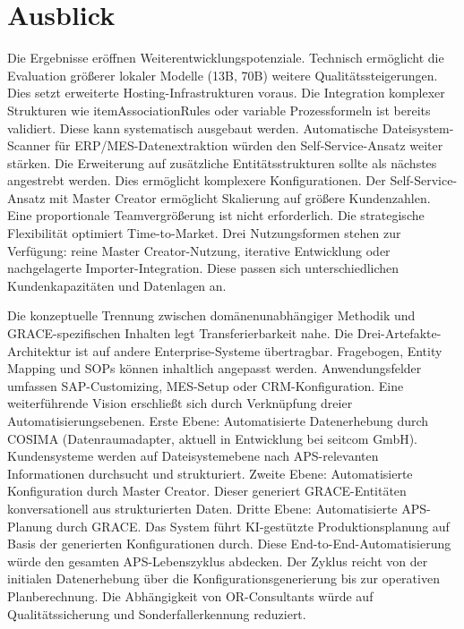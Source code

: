 \section{Ausblick}
\label{sec:Ausblick}

Die Ergebnisse eröffnen Weiterentwicklungspotenziale. Technisch ermöglicht die Evaluation größerer lokaler Modelle (13B, 70B) weitere Qualitätssteigerungen. Dies setzt erweiterte Hosting-Infrastrukturen voraus. Die Integration komplexer Strukturen wie itemAssociationRules oder variable Prozessformeln ist bereits validiert. Diese kann systematisch ausgebaut werden. Automatische Dateisystem-Scanner für ERP/MES-Datenextraktion würden den Self-Service-Ansatz weiter stärken. Die Erweiterung auf zusätzliche Entitätsstrukturen sollte als nächstes angestrebt werden. Dies ermöglicht komplexere Konfigurationen. Der Self-Service-Ansatz mit Master Creator ermöglicht Skalierung auf größere Kundenzahlen. Eine proportionale Teamvergrößerung ist nicht erforderlich. Die strategische Flexibilität optimiert Time-to-Market. Drei Nutzungsformen stehen zur Verfügung: reine Master Creator-Nutzung, iterative Entwicklung oder nachgelagerte Importer-Integration. Diese passen sich unterschiedlichen Kundenkapazitäten und Datenlagen an.

Die konzeptuelle Trennung zwischen domänenunabhängiger Methodik und GRACE-spezifischen Inhalten legt Transferierbarkeit nahe. Die Drei-Artefakte-Architektur ist auf andere Enterprise-Systeme übertragbar. Fragebogen, Entity Mapping und SOPs können inhaltlich angepasst werden. Anwendungsfelder umfassen SAP-Customizing, MES-Setup oder CRM-Konfiguration. Eine weiterführende Vision erschließt sich durch Verknüpfung dreier Automatisierungsebenen. Erste Ebene: Automatisierte Datenerhebung durch COSIMA (Datenraumadapter, aktuell in Entwicklung bei seitcom GmbH). Kundensysteme werden auf Dateisystemebene nach APS-relevanten Informationen durchsucht und strukturiert. Zweite Ebene: Automatisierte Konfiguration durch Master Creator. Dieser generiert GRACE-Entitäten konversationell aus strukturierten Daten. Dritte Ebene: Automatisierte APS-Planung durch GRACE. Das System führt KI-gestützte Produktionsplanung auf Basis der generierten Konfigurationen durch. Diese End-to-End-Automatisierung würde den gesamten APS-Lebenszyklus abdecken. Der Zyklus reicht von der initialen Datenerhebung über die Konfigurationsgenerierung bis zur operativen Planberechnung. Die Abhängigkeit von OR-Consultants würde auf Qualitätssicherung und Sonderfallerkennung reduziert.
